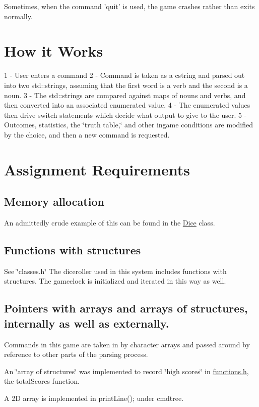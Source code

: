 Sometimes, when the command 'quit' is used, the game crashes rather than exits normally.\hypertarget{index_explain}{}\section{How it Works}\label{index_explain}
1 -\/ User enters a command 2 -\/ Command is taken as a cstring and parsed out into two std\+::strings, assuming that the first word is a verb and the second is a noun. 3 -\/ The std\+::strings are compared against maps of nouns and verbs, and then converted into an associated enumerated value. 4 -\/ The enumerated values then drive switch statements which decide what output to give to the user. 5 -\/ Outcomes, statistics, the \char`\"{}truth table,\char`\"{} and other ingame conditions are modified by the choice, and then a new command is requested.\hypertarget{index_requirements}{}\section{Assignment Requirements}\label{index_requirements}
\hypertarget{index_malloc}{}\subsection{Memory allocation}\label{index_malloc}
An admittedly crude example of this can be found in the \hyperlink{class_dice}{Dice} class.\hypertarget{index_structs}{}\subsection{Functions with structures}\label{index_structs}
See \char`\"{}classes.\+h\char`\"{} The diceroller used in this system includes functions with structures. The gameclock is initialized and iterated in this way as well.\hypertarget{index_arraystructs}{}\subsection{Pointers with arrays and arrays of structures, internally as well as externally.}\label{index_arraystructs}
Commands in this game are taken in by character arrays and passed around by reference to other parts of the parsing process.

An \char`\"{}array of structures\char`\"{} was implemented to record \char`\"{}high scores\char`\"{} in \hyperlink{functions_8h_source}{functions.\+h}, the total\+Scores function.

A 2\+D array is implemented in print\+Line(); under cmdtree. 